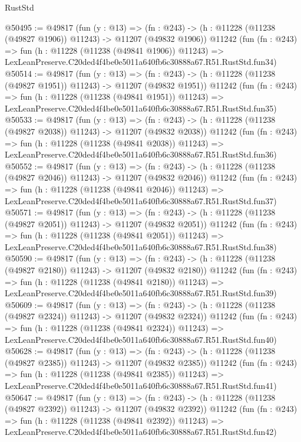 \begin{lexlean}{RustStd}
\begin{coremodule}
@50495 := @49817
    (fun (y : @13) =>
    (fn : @243) -> (h : @11228 (@11238 (@49827 @1906)) @11243) -> @11207 (@49832 @1906))
    @11242
    (fun (fn : @243) =>
    fun (h : @11228 (@11238 (@49841 @1906)) @11243) =>
    LexLeanPreserve.C20ded4f4be0e5011a640fb6c30888a67.R51.RustStd.fun34)
@50514 := @49817
    (fun (y : @13) =>
    (fn : @243) -> (h : @11228 (@11238 (@49827 @1951)) @11243) -> @11207 (@49832 @1951))
    @11242
    (fun (fn : @243) =>
    fun (h : @11228 (@11238 (@49841 @1951)) @11243) =>
    LexLeanPreserve.C20ded4f4be0e5011a640fb6c30888a67.R51.RustStd.fun35)
@50533 := @49817
    (fun (y : @13) =>
    (fn : @243) -> (h : @11228 (@11238 (@49827 @2038)) @11243) -> @11207 (@49832 @2038))
    @11242
    (fun (fn : @243) =>
    fun (h : @11228 (@11238 (@49841 @2038)) @11243) =>
    LexLeanPreserve.C20ded4f4be0e5011a640fb6c30888a67.R51.RustStd.fun36)
@50552 := @49817
    (fun (y : @13) =>
    (fn : @243) -> (h : @11228 (@11238 (@49827 @2046)) @11243) -> @11207 (@49832 @2046))
    @11242
    (fun (fn : @243) =>
    fun (h : @11228 (@11238 (@49841 @2046)) @11243) =>
    LexLeanPreserve.C20ded4f4be0e5011a640fb6c30888a67.R51.RustStd.fun37)
@50571 := @49817
    (fun (y : @13) =>
    (fn : @243) -> (h : @11228 (@11238 (@49827 @2051)) @11243) -> @11207 (@49832 @2051))
    @11242
    (fun (fn : @243) =>
    fun (h : @11228 (@11238 (@49841 @2051)) @11243) =>
    LexLeanPreserve.C20ded4f4be0e5011a640fb6c30888a67.R51.RustStd.fun38)
@50590 := @49817
    (fun (y : @13) =>
    (fn : @243) -> (h : @11228 (@11238 (@49827 @2180)) @11243) -> @11207 (@49832 @2180))
    @11242
    (fun (fn : @243) =>
    fun (h : @11228 (@11238 (@49841 @2180)) @11243) =>
    LexLeanPreserve.C20ded4f4be0e5011a640fb6c30888a67.R51.RustStd.fun39)
@50609 := @49817
    (fun (y : @13) =>
    (fn : @243) -> (h : @11228 (@11238 (@49827 @2324)) @11243) -> @11207 (@49832 @2324))
    @11242
    (fun (fn : @243) =>
    fun (h : @11228 (@11238 (@49841 @2324)) @11243) =>
    LexLeanPreserve.C20ded4f4be0e5011a640fb6c30888a67.R51.RustStd.fun40)
@50628 := @49817
    (fun (y : @13) =>
    (fn : @243) -> (h : @11228 (@11238 (@49827 @2385)) @11243) -> @11207 (@49832 @2385))
    @11242
    (fun (fn : @243) =>
    fun (h : @11228 (@11238 (@49841 @2385)) @11243) =>
    LexLeanPreserve.C20ded4f4be0e5011a640fb6c30888a67.R51.RustStd.fun41)
@50647 := @49817
    (fun (y : @13) =>
    (fn : @243) -> (h : @11228 (@11238 (@49827 @2392)) @11243) -> @11207 (@49832 @2392))
    @11242
    (fun (fn : @243) =>
    fun (h : @11228 (@11238 (@49841 @2392)) @11243) =>
    LexLeanPreserve.C20ded4f4be0e5011a640fb6c30888a67.R51.RustStd.fun42)

\end{coremodule}
\end{lexlean}
